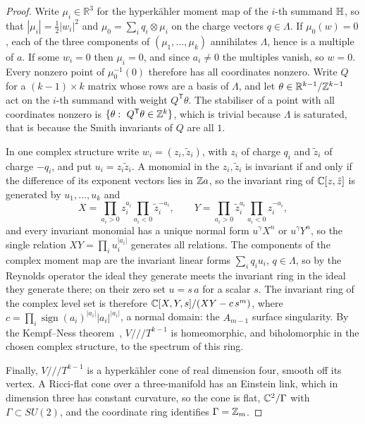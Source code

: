 \begin{proof}
Write $\mu_i\in\mathbb R^3$ for the hyperk\"ahler moment map of the $i$-th summand $\mathbb H$, so
that $|\mu_i|=\frac12|w_i|^2$ and $\mu_0=\sum_iq_i\otimes\mu_i$ on the charge vectors $q\in\Lambda$.
If $\mu_0(w)=0$, each of the three components of $(\mu_1,\dots,\mu_k)$ annihilates $\Lambda$,
hence is a multiple of $a$. If some $w_i=0$ then $\mu_i=0$, and since $a_i\neq0$ the multiples
vanish, so $w=0$. Every nonzero point of $\mu_0^{-1}(0)$ therefore has all coordinates nonzero.
Write $Q$ for a $(k-1)\times k$ matrix whose rows are a basis of $\Lambda$, and let
$\theta\in\mathbb R^{k-1}/\mathbb Z^{k-1}$ act on the $i$-th summand with weight $Q^{\mathsf T}\theta$.
The stabiliser of a point with all coordinates nonzero is $\{\theta:\ Q^{\mathsf
T}\theta\in\mathbb Z^k\}$, which is trivial because $\Lambda$ is saturated, that is because the Smith
invariants of $Q$ are all $1$.

In one complex structure write $w_i=(z_i,\tilde z_i)$, with $z_i$ of charge $q_i$ and $\tilde
z_i$ of charge $-q_i$, and put $u_i=z_i\tilde z_i$. A monomial in the $z_i,\tilde z_i$ is
invariant if and only if the difference of its exponent vectors lies in $\mathbb Z a$, so the
invariant ring of $\mathbb C[z,\tilde z]$ is generated by $u_1,\dots,u_k$ and
\[
 X=\prod_{a_i>0}z_i^{a_i}\prod_{a_i<0}\tilde z_i^{-a_i},\qquad
 Y=\prod_{a_i>0}\tilde z_i^{a_i}\prod_{a_i<0}z_i^{-a_i},
\]
and every invariant monomial has a unique normal form $u^\gamma X^n$ or $u^\gamma Y^n$, so the
single relation $XY=\prod_iu_i^{|a_i|}$ generates all relations. The components of the complex
moment map are the invariant linear forms $\sum_iq_iu_i$, $q\in\Lambda$, so by the Reynolds
operator the ideal they generate meets the invariant ring in the ideal they generate there; on
their zero set $u=s\,a$ for a scalar $s$. The invariant ring of the complex level set is
therefore $\mathbb C[X,Y,s]/(XY-c\,s^m)$, where $c=\prod_i\operatorname{sign}(a_i)^{|a_i|}|a_i|^{|a_i|}$,
a normal domain: the $A_{m-1}$ surface singularity. By the Kempf--Ness
theorem~\cite{KempfNess:1979}, $V/\!/\!/T^{k-1}$ is homeomorphic, and biholomorphic in the
chosen complex structure, to the spectrum of this ring.

Finally, $V/\!/\!/T^{k-1}$ is a hyperk\"ahler cone of real dimension four, smooth off its vertex.
A Ricci-flat cone over a three-manifold has an Einstein link, which in dimension three has
constant curvature, so the cone is flat, $\mathbb C^2/\Gamma$ with $\Gamma\subset SU(2)$, and the
coordinate ring identifies $\Gamma=\mathbb Z_m$.
\end{proof}

